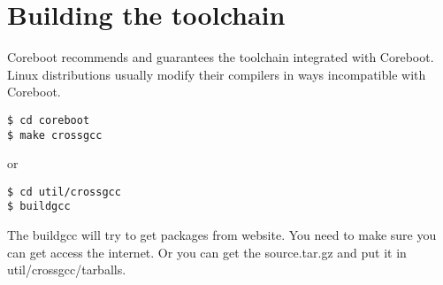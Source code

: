\documentclass[titlepage,12pt]{article}
\begin{document}
%
%

\section{Building the toolchain}
Coreboot recommends and guarantees the toolchain integrated with Coreboot.
Linux distributions usually modify their compilers in ways incompatible with Coreboot.

{ \small
\begin{verbatim}
$ cd coreboot
$ make crossgcc
\end{verbatim}
}

or

{ \small
\begin{verbatim}
$ cd util/crossgcc
$ buildgcc
\end{verbatim}
}

The buildgcc will try to get packages from website. You need to make sure you can
get access the internet. Or you can get the source.tar.gz and put it in util/crossgcc/tarballs.
\end{document}
